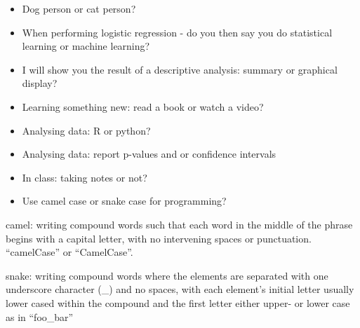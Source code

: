 \documentclass[
  ignorenonframetext,
]{beamer}
\providecommand{\tightlist}{%
  \setlength{\itemsep}{0pt}\setlength{\parskip}{0pt}}
\begin{document}
\begin{frame}

\begin{itemize}
\tightlist
\item
  Dog person or cat person?
\item
  When performing logistic regression - do you then say you do
  statistical learning or machine learning?
\item
  I will show you the result of a descriptive analysis: summary or
  graphical display?
\item
  Learning something new: read a book or watch a video?
\item
  Analysing data: R or python?
\item
  Analysing data: report p-values and or confidence intervals
\item
  In class: taking notes or not?
\item
  Use camel case or snake case for programming?
\end{itemize}

camel: writing compound words such that each word in the middle of the
phrase begins with a capital letter, with no intervening spaces or
punctuation. ``camelCase'' or ``CamelCase''.

snake: writing compound words where the elements are separated with one
underscore character (\_) and no spaces, with each element's initial
letter usually lower cased within the compound and the first letter
either upper- or lower case as in ``foo\_bar''

\end{frame}
\end{document}
